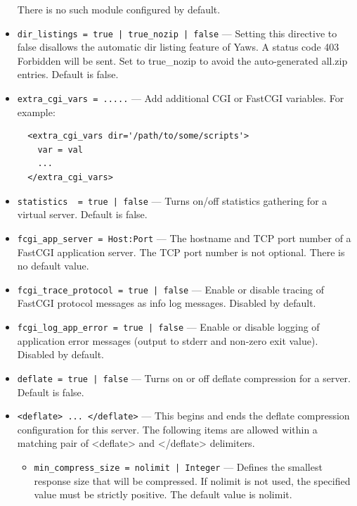 \documentclass[11pt,oneside,english]{book}
\newcommand{\Yaws}            %
        {{\sc Yaws}}
\begin{document}
\begin{itemize}
              There is no such module configured by default.

\item       \verb+dir_listings = true | true_nozip | false+ ---
             Setting this directive to false disallows the automatic dir listing
             feature of \Yaws{}. A status code 403 Forbidden will be sent.  Set
             to true\_nozip to avoid the auto-generated all.zip entries. Default
             is false.

\item       \verb+extra_cgi_vars = .....+ ---
             Add additional CGI or FastCGI variables. For example:
\begin{verbatim}
  <extra_cgi_vars dir='/path/to/some/scripts'>
    var = val
    ...
  </extra_cgi_vars>
\end{verbatim}

\item       \verb+statistics  = true | false+ ---
             Turns on/off statistics gathering for a virtual server. Default is
             false.

\item       \verb+fcgi_app_server = Host:Port+ ---
             The hostname and TCP port number of a FastCGI application
             server. The TCP port number is not optional. There is no default
             value.

\item       \verb+fcgi_trace_protocol = true | false+ ---
             Enable or disable tracing of FastCGI protocol messages as info log
             messages. Disabled by default.

\item       \verb+fcgi_log_app_error = true | false+ ---
             Enable or disable logging of application error messages (output to
             stderr and non-zero exit value). Disabled by default.

\item       \verb+deflate = true | false+ ---
             Turns on or off deflate compression for a server. Default is
             false.

\item       \verb+<deflate> ... </deflate>+ ---
             This begins and ends the deflate compression configuration for this
             server. The following items are allowed within a matching pair of
             <deflate> and </deflate> delimiters.

             \begin{itemize}
             \item \verb+min_compress_size = nolimit | Integer+ --- Defines the
               smallest response size that will be compressed. If nolimit is not
               used, the specified value must be strictly positive. The default
               value is nolimit.


\end{itemize}
\end{itemize}
\end{document}
